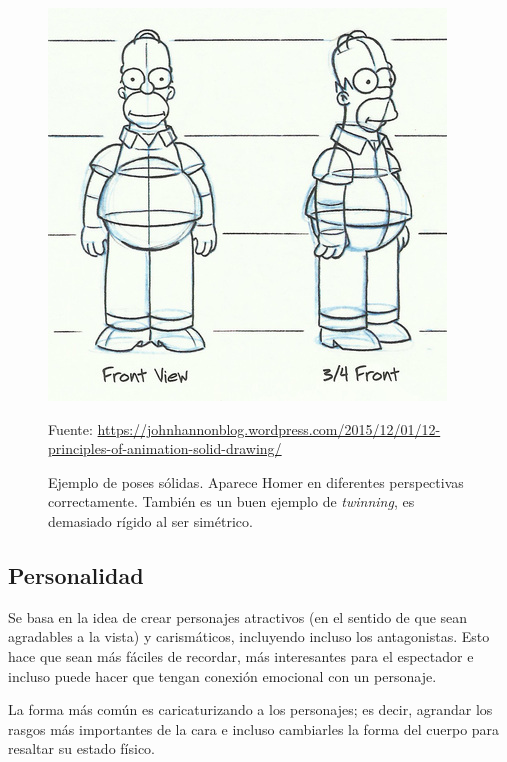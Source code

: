 \documentclass{article}
\begin{document}
\begin{figure}[H]
    \centering
    \includegraphics[width=\textwidth]{imagenes/homer-solid-drawing.jpg}
    \caption{Ejemplo de poses sólidas. Aparece Homer en diferentes perspectivas correctamente. También es un buen ejemplo de \textit{twinning}, es demasiado rígido al ser simétrico.}
    \vspace{10pt}
    \footnotesize{Fuente: \url{https://johnhannonblog.wordpress.com/2015/12/01/12-principles-of-animation-solid-drawing/}}
\end{figure}

\subsection{Personalidad}

Se basa en la idea de crear personajes atractivos (en el sentido de que sean agradables a la vista) y carismáticos, incluyendo incluso los antagonistas. Esto hace que sean más fáciles de recordar, más interesantes para el espectador e incluso puede hacer que tengan conexión emocional con un personaje. \cite{idearocket}

\bigskip

La forma más común es caricaturizando a los personajes; es decir, agrandar los rasgos más importantes de la cara e incluso cambiarles la forma del cuerpo para resaltar su estado físico.
\end{document}
